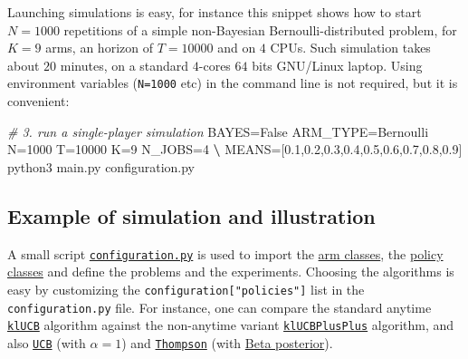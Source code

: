 \documentclass[a4paper,10pt,]{article}
\newenvironment{Shaded}{}{}
\newcommand{\CommentTok}[1]{\textcolor[rgb]{0.38,0.63,0.69}{\textit{#1}}}
\newcommand{\ExtensionTok}[1]{#1}
\newcommand{\KeywordTok}[1]{\textcolor[rgb]{0.00,0.44,0.13}{\textbf{#1}}}
\newcommand{\NormalTok}[1]{#1}
\newcommand{\VariableTok}[1]{\textcolor[rgb]{0.10,0.09,0.49}{#1}}
\begin{document}
Launching simulations is easy, for instance this snippet shows how to
start \(N=1000\) repetitions of a simple non-Bayesian
Bernoulli-distributed problem, for \(K=9\) arms, an horizon of
\(T=10000\) and on \(4\) CPUs. Such simulation takes about \(20\) minutes, on a standard \(4\)-cores \(64\) bits GNU/Linux
laptop. Using environment variables (\texttt{N=1000} etc) in the command
line is not required, but it is convenient:

\begin{Shaded}
\begin{Highlighting}[]
\CommentTok{# 3. run a single-player simulation}
\NormalTok{\textdollar }\VariableTok{BAYES=}\NormalTok{False }\VariableTok{ARM_TYPE=}\NormalTok{Bernoulli }\VariableTok{N=}\NormalTok{1000 }\VariableTok{T=}\NormalTok{10000 }\VariableTok{K=}\NormalTok{9 }\VariableTok{N_JOBS=}\NormalTok{4 }\KeywordTok{\textbackslash{}}
  \VariableTok{MEANS=}\NormalTok{[}\ExtensionTok{0.1}\NormalTok{,0.2,0.3,0.4,0.5,0.6,0.7,0.8,0.9] python3 main.py configuration.py}
\end{Highlighting}
\end{Shaded}

\subsection{Example of simulation and
illustration}\label{example-of-simulation-and-illustration}

A small script
\href{https://SMPyBandits.GitHub.io/docs/configuration.html}{\texttt{configuration.py}}
is used to import the
\href{https://SMPyBandits.GitHub.io/docs/Arms.html}{arm classes}, the
\href{https://SMPyBandits.GitHub.io/docs/Policies.html}{policy classes}
and define the problems and the experiments. Choosing the algorithms is
easy by customizing the \texttt{configuration{[}"policies"{]}} list in
the \texttt{configuration.py} file. For instance, one can compare the
standard anytime
\href{https://SMPyBandits.GitHub.io/docs/Policies.klUCB.html}{\texttt{klUCB}}
algorithm against the non-anytime variant
\href{https://SMPyBandits.GitHub.io/docs/Policies.klUCBPlusPlus.html}{\texttt{klUCBPlusPlus}}
algorithm, and also
\href{https://SMPyBandits.GitHub.io/docs/Policies.UCBalpha.html}{\texttt{UCB}}
(with \(\alpha=1\)) and
\href{https://SMPyBandits.GitHub.io/docs/Policies.Thompson.html}{\texttt{Thompson}}
(with
\href{https://SMPyBandits.GitHub.io/docs/Policies.Posterior.Beta.html}{Beta
posterior}).
\end{document}
